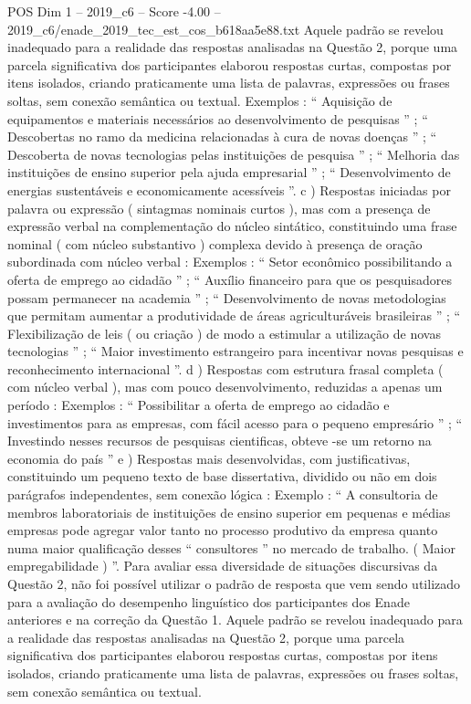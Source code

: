 \begin{textsample}{POS Dim 1 – 2019\_c6 – Score -4.00 – 2019\_c6/enade\_2019\_tec\_est\_cos\_b618aa5e88.txt}
Aquele padrão se revelou inadequado para a realidade das respostas analisadas na Questão 2, porque uma parcela significativa dos participantes elaborou respostas curtas, compostas por itens isolados, criando praticamente uma lista de palavras, expressões ou frases soltas, sem conexão semântica ou textual.
Exemplos : “ Aquisição de equipamentos e materiais necessários ao desenvolvimento de pesquisas ” ; “ Descobertas no ramo da medicina relacionadas à cura de novas doenças ” ; “ Descoberta de novas tecnologias pelas instituições de pesquisa ” ; “ Melhoria das instituições de ensino superior pela ajuda empresarial ” ; “ Desenvolvimento de energias sustentáveis e economicamente acessíveis ”. c ) Respostas iniciadas por palavra ou expressão ( sintagmas nominais curtos ), mas com a presença de expressão verbal na complementação do núcleo sintático, constituindo uma frase nominal ( com núcleo substantivo ) complexa devido à presença de oração subordinada com núcleo verbal : Exemplos : “ Setor econômico possibilitando a oferta de emprego ao cidadão ” ; “ Auxílio financeiro para que os pesquisadores possam permanecer na academia ” ; “ Desenvolvimento de novas metodologias que permitam aumentar a produtividade de áreas agriculturáveis brasileiras ” ; “ Flexibilização de leis ( ou criação ) de modo a estimular a utilização de novas tecnologias ” ; “ Maior investimento estrangeiro para incentivar novas pesquisas e reconhecimento internacional ”. d ) Respostas com estrutura frasal completa ( com núcleo verbal ), mas com pouco desenvolvimento, reduzidas a apenas um período : Exemplos : “ Possibilitar a oferta de emprego ao cidadão e investimentos para as empresas, com fácil acesso para o pequeno empresário ” ; “ Investindo nesses recursos de pesquisas cientificas, obteve -se um retorno na economia do país ” e ) Respostas mais desenvolvidas, com justificativas, constituindo um pequeno texto de base dissertativa, dividido ou não em dois parágrafos independentes, sem conexão lógica : Exemplo : “ A consultoria de membros laboratoriais de instituições de ensino superior em pequenas e médias empresas pode agregar valor tanto no processo produtivo da empresa quanto numa maior qualificação desses “ consultores ” no mercado de trabalho. ( Maior empregabilidade ) ”.
Para avaliar essa diversidade de situações discursivas da Questão 2, não foi possível utilizar o padrão de resposta que vem sendo utilizado para a avaliação do desempenho linguístico dos participantes dos Enade anteriores e na correção da Questão 1.
Aquele padrão se revelou inadequado para a realidade das respostas analisadas na Questão 2, porque uma parcela significativa dos participantes elaborou respostas curtas, compostas por itens isolados, criando praticamente uma lista de palavras, expressões ou frases soltas, sem conexão semântica ou textual.

\end{textsample}
